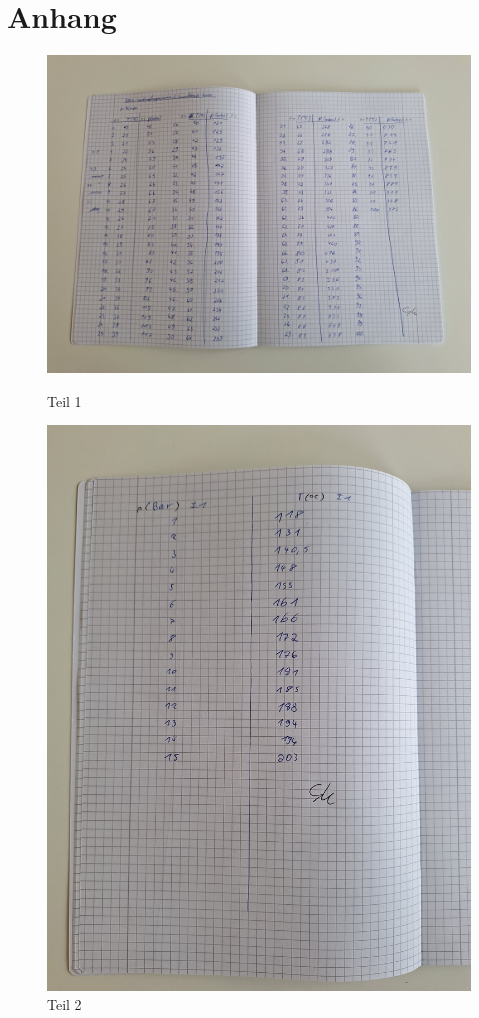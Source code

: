 \section{Anhang}
\label{sec:Anhang}

\begin{figure}[h]
    \centering
    \begin{minipage}{0.5\textwidth}
        \centering
        \includegraphics[width=\textwidth]{Bilder/mw1.jpg}
        \caption{Teil 1}
    \end{minipage}
    \hfill
    \centering
    \begin{minipage}{0.5\textwidth}
        \centering
        \includegraphics[width=\textwidth]{Bilder/mw2.jpg}
        \caption{Teil 2}
    \end{minipage}
    \hfill
\end{figure}
